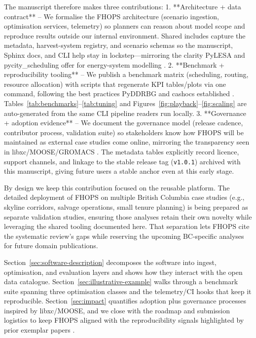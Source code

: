 The manuscript therefore makes three contributions:
1. **Architecture + data contract** – We formalise the FHOPS architecture (scenario ingestion, optimisation services, telemetry) so planners can reason about model scope and reproduce results outside our internal environment. Shared includes capture the metadata, harvest-system registry, and scenario schemas so the manuscript, Sphinx docs, and CLI help stay in lockstep—mirroring the clarity PyLESA and pycity\_scheduling offer for energy-system modelling \cite{Lyden2021PyLESA,Schwarz2021pycity}.
2. **Benchmark + reproducibility tooling** – We publish a benchmark matrix (scheduling, routing, resource allocation) with scripts that regenerate KPI tables/plots via one command, following the best practices PyDDRBG and cashocs established \cite{Ahrari2022PyDDRBG,Blauth2023cashocs}. Tables~\ref{tab:benchmarks}--\ref{tab:tuning} and Figures~\ref{fig:playback}--\ref{fig:scaling} are auto-generated from the same CLI pipeline readers run locally.
3. **Governance + adoption evidence** – We document the governance model (release cadence, contributor process, validation suite) so stakeholders know how FHOPS will be maintained as external case studies come online, mirroring the transparency seen in libxc/MOOSE/GROMACS \cite{Lehtola2018libxc,Permann2020MOOSE,Abraham2015GROMACS}. The metadata tables explicitly record licence, support channels, and linkage to the stable release tag (\texttt{v1.0.1}) archived with this manuscript, giving future users a stable anchor even at this early stage.

By design we keep this contribution focused on the reusable platform. The detailed deployment of FHOPS on multiple British Columbia case studies (e.g., skyline corridors, salvage operations, small tenure planning) is being prepared as separate validation studies, ensuring those analyses retain their own novelty while leveraging the shared tooling documented here. That separation lets FHOPS cite the systematic review’s gaps while reserving the upcoming BC-specific analyses for future domain publications.

Section~\ref{sec:software-description} decomposes the software into ingest, optimisation, and evaluation layers and shows how they interact with the open data catalogue. Section~\ref{sec:illustrative-example} walks through a benchmark suite spanning three optimisation classes and the telemetry/CI hooks that keep it reproducible. Section~\ref{sec:impact} quantifies adoption plus governance processes inspired by libxc/MOOSE, and we close with the roadmap and submission logistics to keep FHOPS aligned with the reproducibility signals highlighted by prior exemplar papers \cite{Blauth2023cashocs}.

